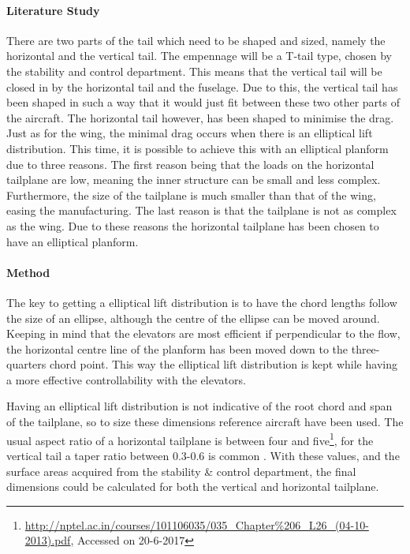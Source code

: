 \paragraph{Literature Study} There are two parts of the tail which need to be shaped and sized, namely the horizontal and the vertical tail. The empennage will be a T-tail type, chosen by the stability and control department. This means that the vertical tail will be closed in by the horizontal tail and the fuselage. Due to this, the vertical tail has been shaped in such a way that it would just fit between these two other parts of the aircraft. The horizontal tail however, has been shaped to minimise the drag. Just as for the wing, the minimal drag occurs when there is an elliptical lift distribution. This time, it is possible to achieve this with an elliptical planform due to three reasons. The first reason being that the loads on the horizontal tailplane are low, meaning the inner structure can be small and less complex. Furthermore, the size of the tailplane is much smaller than that of the wing, easing the manufacturing. The last reason is that the tailplane is not as complex as the wing. Due to these reasons the horizontal tailplane has been chosen to have an elliptical planform.

\paragraph{Method} The key to getting a elliptical lift distribution is to have the chord lengths follow the size of an ellipse, although the centre of the ellipse can be moved around. Keeping in mind that the elevators are most efficient if perpendicular to the flow, the horizontal centre line of the planform has been moved down to the three-quarters chord point. This way the elliptical lift distribution is kept while having a more effective controllability with the elevators. 

Having an elliptical lift distribution is not indicative of the root chord and span of the tailplane, so to size these dimensions reference aircraft have been used. The usual aspect ratio of a horizontal tailplane is between four and five\footnote{\url{http://nptel.ac.in/courses/101106035/035_Chapter\%206_L26_(04-10-2013).pdf}, Accessed on 20-6-2017}, for the vertical tail a taper ratio between 0.3-0.6 is common \cite{verticaltailtaper}. With these values, and the surface areas acquired from the stability \& control department, the final dimensions could be calculated for both the vertical and horizontal tailplane.



